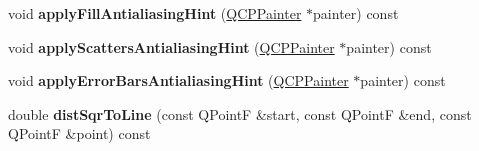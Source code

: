 \begin{DoxyCompactItemize}
void {\bfseries apply\+Fill\+Antialiasing\+Hint} (\hyperlink{class_q_c_p_painter}{Q\+C\+P\+Painter} $\ast$painter) const
\item 
\hypertarget{class_q_c_p_abstract_plottable_ac95f26b15a1e5d9c7bd2c0a46d760fc9}{}\label{class_q_c_p_abstract_plottable_ac95f26b15a1e5d9c7bd2c0a46d760fc9} 
void {\bfseries apply\+Scatters\+Antialiasing\+Hint} (\hyperlink{class_q_c_p_painter}{Q\+C\+P\+Painter} $\ast$painter) const
\item 
\hypertarget{class_q_c_p_abstract_plottable_a0889abc8dbfd357053f40bfafff8bf7d}{}\label{class_q_c_p_abstract_plottable_a0889abc8dbfd357053f40bfafff8bf7d} 
void {\bfseries apply\+Error\+Bars\+Antialiasing\+Hint} (\hyperlink{class_q_c_p_painter}{Q\+C\+P\+Painter} $\ast$painter) const
\item 
\hypertarget{class_q_c_p_abstract_plottable_af7e992b638c8aa688abceac579bb90d7}{}\label{class_q_c_p_abstract_plottable_af7e992b638c8aa688abceac579bb90d7} 
double {\bfseries dist\+Sqr\+To\+Line} (const Q\+PointF \&start, const Q\+PointF \&end, const Q\+PointF \&point) const
\end{DoxyCompactItemize}
